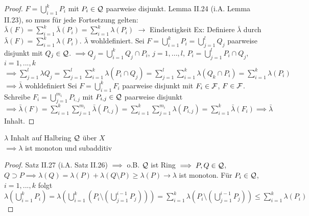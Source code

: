 \documentclass[11pt,a4paper,fleqn,openany]{report}
\begin{document}
    \begin{proof}
      $F = \bigcup\limits_{i=1}^{k}P_i$ mit $P_i \in \mathcal{Q}$ paarweise disjunkt. \newline
      Lemma II.24 (i.A. Lemma II.23), so muss für jede Fortsetzung gelten: \newline
      $\bar{\lambda}(F) = \sum\limits_{i=1}^{k}\bar{\lambda}(P_i) = \sum\limits_{i=1}^{k}\lambda(P_i)$ \newline
      $\rightarrow$ Eindeutigkeit \newline
      Ex: Definiere $\bar{\lambda}$ durch $\bar{\lambda}(F) = \sum\limits_{i=1}^{k}\lambda(P_i)$. \newline
      $\bar{\lambda}$ wohldefiniert. Sei $F = \bigcup\limits_{i=1}^{k}P_i = \bigcup\limits_{j=1}^{l}Q_j$ paarweise disjunkt mit $Q_j \in \mathcal{Q}$. \newline
      $\implies Q_j = \bigcup\limits_{i=1}^{k}Q_j \cap P_i$, $j=1,...,l$, $P_i = \bigcup\limits_{j=1}^{l}P_i\cap Q_j$, $i=1,...,k$ \newline
      $\implies \sum\limits_{j=1}^{l}\lambda{Q_j} = \sum\limits_{j=1}^{l}\sum\limits_{i=1}^{k}\lambda(P_i \cap Q_j) = \sum\limits_{j=1}^{l}\sum\limits_{i=1}^{k} \lambda(Q_k \cap P_i) = \sum\limits_{i=1}^{k}\lambda(P_i)$ \newline
      $\implies \bar{\lambda}$ wohldefiniert \newline
      Sei $F = \bigcup\limits_{i=1}^{k}F_i$ paarweise disjunkt mit $F_i \in \mathcal{F}$, $F\in\mathcal{F}$. Schreibe $F_i = \bigcup\limits_{j=1}^{m_i}P_{i,j}$ mit $P_{i,j}\in\mathcal{Q}$ paarweise disjunkt \newline
      $\implies \bar{\lambda}(F) = \sum\limits_{i=1}^{k} \sum\limits_{j=1}^{m_i}\bar{\lambda}(P_{i,j}) = \sum\limits_{i=1}^{k}\sum\limits_{j=1}^{m_i}\lambda(P_{i,j}) = \sum\limits_{i=1}^{k}\bar{\lambda}(F_i) \implies \bar{\lambda}$ Inhalt.
    \end{proof}

    \begin{lemma}[i.A. II.27]
      $\lambda$ Inhalt auf Halbring $\mathcal{Q}$ über $X$\\
      $\implies \lambda$ ist monoton und subadditiv
    \end{lemma}

    \begin{proof}
      Satz II.27 (i.A. Satz II.26) $\implies$ o.B. $\mathcal{Q}$ ist Ring \newline
      $\implies P,Q\in\mathcal{Q}$, $Q\supset P \implies \lambda(Q) = \lambda(P) + \lambda(Q\setminus P) \geq \lambda(P) \rightarrow \lambda$ ist monoton. \newline
      Für $P_i\in\mathcal{Q}$, $i=1,...,k$ folgt \newline $\lambda(\bigcup\limits_{i=1}^{k}P_i) = \lambda(\bigcup\limits_{i=1}^{k}(P_i\setminus (\bigcup\limits_{j=1}^{i-1}P_j))) = \sum\limits_{i=1}^{k}\lambda(P_i\setminus (\bigcup\limits_{j=1}^{i-1}P_j)) \leq \sum\limits_{i=1}^{k}\lambda(P_i)$
    \end{proof}
\end{document}
